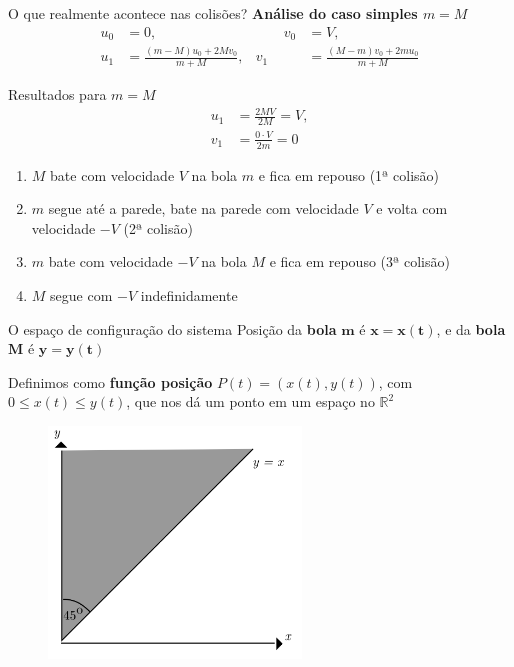 \documentclass{beamer}
\begin{document}
\begin{frame}{O que realmente acontece nas colisões?}
  \textbf{Análise do caso simples $m = M$}
  \begin{equation*}
    \begin{alignedat}{2}
      u_0 &= 0,                           &\qquad v_0 &= V, \\
      u_1 &= \frac{(m - M)u_0 + 2Mv_0}{m + M}, & v_1 &= \frac{(M - m)v_0 + 2mu_0}{m + M}
    \end{alignedat}
  \end{equation*}
\end{frame}

\begin{frame}{Resultados para $m = M$}
  \begin{equation*}
    \begin{aligned}
      u_1 &= \frac{2MV}{2M} = V, \\
      v_1 &= \frac{0 \cdot V}{2m} = 0
    \end{aligned}
  \end{equation*}
  \begin{enumerate}
    \item $M$ bate com velocidade $V$ na bola $m$ e fica em repouso (1ª colisão)
    \item $m$ segue até a parede, bate na parede com velocidade $V$ e volta com velocidade $-V$ (2ª colisão)
    \item $m$ bate com velocidade $-V$ na bola $M$ e fica em repouso (3ª colisão)
    \item $M$ segue com $-V$ indefinidamente
  \end{enumerate}
\end{frame}

\begin{frame}{O espaço de configuração do sistema}
  Posição da \textbf{bola} $\mathbf{m}$ é $\mathbf{x=x(t)}$, e da \textbf{bola} $\mathbf{M}$ é $\mathbf{y=y(t)}$
  
  Definimos como \textbf{função posição} $P(t) = (x(t), y(t))$, com $0 \le x(t) \le y(t)$, que nos dá um ponto em um espaço no $\mathbb{R}^2$

  \begin{figure}
    \centering
    \includegraphics[width=0.6\textwidth]{images/image1-1.png}
  \end{figure}
\end{frame}
\end{document}
